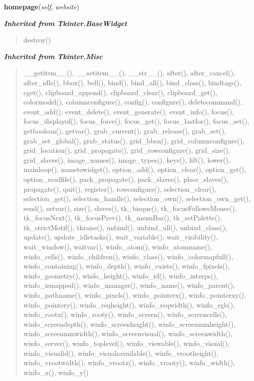     \vspace{0.5ex}

\hspace{.8\funcindent}\begin{boxedminipage}{\funcwidth}

    \raggedright \textbf{homepage}(\textit{self}, \textit{website})

\setlength{\parskip}{2ex}
\setlength{\parskip}{1ex}
    \end{boxedminipage}


\large{\textbf{\textit{Inherited from Tkinter.BaseWidget}}}

\begin{quote}
destroy()
\end{quote}

\large{\textbf{\textit{Inherited from Tkinter.Misc}}}

\begin{quote}
\_\_getitem\_\_(), \_\_setitem\_\_(), \_\_str\_\_(), after(), after\_cancel(), after\_idle(), bbox(), bell(), bind(), bind\_all(), bind\_class(), bindtags(), cget(), clipboard\_append(), clipboard\_clear(), clipboard\_get(), colormodel(), columnconfigure(), config(), configure(), deletecommand(), event\_add(), event\_delete(), event\_generate(), event\_info(), focus(), focus\_displayof(), focus\_force(), focus\_get(), focus\_lastfor(), focus\_set(), getboolean(), getvar(), grab\_current(), grab\_release(), grab\_set(), grab\_set\_global(), grab\_status(), grid\_bbox(), grid\_columnconfigure(), grid\_location(), grid\_propagate(), grid\_rowconfigure(), grid\_size(), grid\_slaves(), image\_names(), image\_types(), keys(), lift(), lower(), mainloop(), nametowidget(), option\_add(), option\_clear(), option\_get(), option\_readfile(), pack\_propagate(), pack\_slaves(), place\_slaves(), propagate(), quit(), register(), rowconfigure(), selection\_clear(), selection\_get(), selection\_handle(), selection\_own(), selection\_own\_get(), send(), setvar(), size(), slaves(), tk\_bisque(), tk\_focusFollowsMouse(), tk\_focusNext(), tk\_focusPrev(), tk\_menuBar(), tk\_setPalette(), tk\_strictMotif(), tkraise(), unbind(), unbind\_all(), unbind\_class(), update(), update\_idletasks(), wait\_variable(), wait\_visibility(), wait\_window(), waitvar(), winfo\_atom(), winfo\_atomname(), winfo\_cells(), winfo\_children(), winfo\_class(), winfo\_colormapfull(), winfo\_containing(), winfo\_depth(), winfo\_exists(), winfo\_fpixels(), winfo\_geometry(), winfo\_height(), winfo\_id(), winfo\_interps(), winfo\_ismapped(), winfo\_manager(), winfo\_name(), winfo\_parent(), winfo\_pathname(), winfo\_pixels(), winfo\_pointerx(), winfo\_pointerxy(), winfo\_pointery(), winfo\_reqheight(), winfo\_reqwidth(), winfo\_rgb(), winfo\_rootx(), winfo\_rooty(), winfo\_screen(), winfo\_screencells(), winfo\_screendepth(), winfo\_screenheight(), winfo\_screenmmheight(), winfo\_screenmmwidth(), winfo\_screenvisual(), winfo\_screenwidth(), winfo\_server(), winfo\_toplevel(), winfo\_viewable(), winfo\_visual(), winfo\_visualid(), winfo\_visualsavailable(), winfo\_vrootheight(), winfo\_vrootwidth(), winfo\_vrootx(), winfo\_vrooty(), winfo\_width(), winfo\_x(), winfo\_y()
\end{quote}

